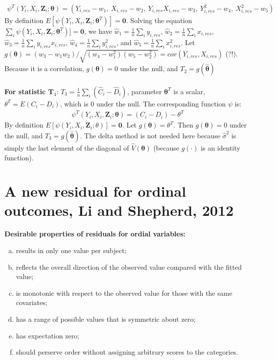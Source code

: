 \documentclass[]{article}
\begin{document}
$$
\begin{aligned}
	\psi^T(Y_i,X_i,\pmb{Z}_i;\pmb{\theta}) = (Y_{i,res}-w_1, ~X_{i,res}-w_2,  ~Y_{i,res}X_{i,res}-w_3, ~Y^2_{i,res}-w_4, ~X^2_{i,res}-w_5)
\end{aligned}
$$
By definition $E[\psi(Y_i,X_i,\pmb{Z}_i;\pmb{\theta}^T)]=\pmb{0}$. Solving the equation $\sum_i\psi(Y_i,X_i,\pmb{Z}_i;\pmb{\theta}^T)]=\pmb{0}$, we have $\hat{w}_1=\frac{1}{n}\sum_i y_{i,res}$, $\hat{w}_2=\frac{1}{n}\sum_i x_{i,res}$, $\hat{w}_3=\frac{1}{n}\sum_i y_{i,res}x_{i,res}$, $\hat{w}_4=\frac{1}{n}\sum_i y^2_{i,res}$, and $\hat{w}_5=\frac{1}{n}\sum_i x^2_{i,res}$. Let $g(\pmb{\theta}) = (w_3 - w_1w_2)/\sqrt{(w_4-w_1^2)(w_5-w_2^2)}=cor(Y_{i,res},X_{i,res})$ (?!). Because it is a correlation, $g(\pmb{\theta})=0$ under the null, and $T_2=g(\hat{\pmb{\theta}})$\\
~\\
\textbf{For statistic $\pmb{T}_3$}: $T_3 = \frac{1}{n}\sum_i (\hat{C}_i - \hat{D}_i)$, parameter $\pmb{\theta}^T$ is a scalar, $\theta^T = E(C_i - D_i)$, which is $0$ under the null. The corresponding function $\psi$ is:
$$
\begin{aligned}
	\psi^T(Y_i,X_i,\pmb{Z}_i;\pmb{\theta}) = (C_i - D_i) - \theta^T
\end{aligned}
$$
By definition $E[\psi(Y_i,X_i,\pmb{Z}_i;\theta)]=\pmb{0}$. Let $g(\pmb{\theta}) = \theta^T$. Then $g(\pmb{\theta}) = 0$ under the null, and $T_3=g(\hat{\pmb{\theta}}) $. The delta method is not needed here because $\hat{\sigma}^2$ is simply the last element of the diagonal of $\hat{V}(\pmb{\theta})$ (because $g(\cdot)$ is an identity function).
\section{A new residual for ordinal outcomes, Li and Shepherd, 2012 \cite{li2012new}}
\textbf{Desirable properties of residuals for ordial variables:}
\begin{enumerate}[(a)]
	\item results in only one value per subject;
	\item reflects the overall direction of the observed value compared with the fitted value;
	\item is monotonic with respect to the observed value for those with the same covariates;
	\item has a range of possible values that is symmetric about zero;
	\item has expectation zero;
	\item should perserve order without assigning arbitrary scores to the categories.
\end{enumerate}
~\\
\end{document}
